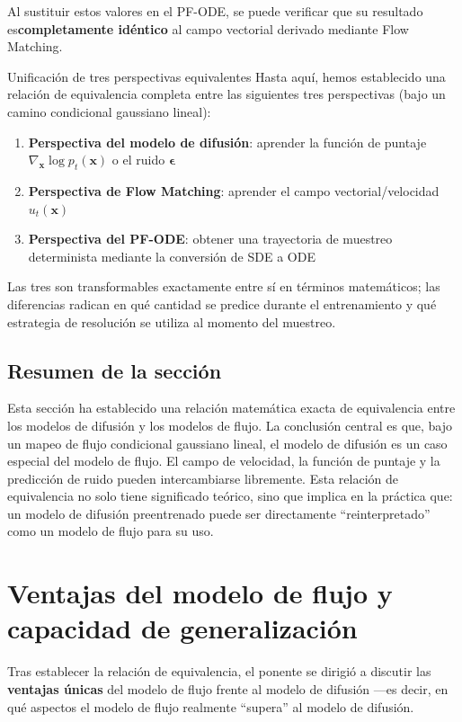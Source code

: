 \documentclass[a4paper]{article}
\begin{document}
Al sustituir estos valores en el PF-ODE, se puede verificar que su resultado es\textbf{completamente idéntico} al campo vectorial derivado mediante Flow Matching.

\begin{importantbox}{Unificación de tres perspectivas equivalentes}
Hasta aquí, hemos establecido una relación de equivalencia completa entre las siguientes tres perspectivas (bajo un camino condicional gaussiano lineal):
\begin{enumerate}
    \item \textbf{Perspectiva del modelo de difusión}: aprender la función de puntaje $\nabla_\mathbf{x} \log p_t(\mathbf{x})$ o el ruido $\boldsymbol{\epsilon}$
    \item \textbf{Perspectiva de Flow Matching}: aprender el campo vectorial/velocidad $u_t(\mathbf{x})$
    \item \textbf{Perspectiva del PF-ODE}: obtener una trayectoria de muestreo determinista mediante la conversión de SDE a ODE
\end{enumerate}
Las tres son transformables exactamente entre sí en términos matemáticos; las diferencias radican en qué cantidad se predice durante el entrenamiento y qué estrategia de resolución se utiliza al momento del muestreo.
\end{importantbox}

\subsection{Resumen de la sección}

Esta sección ha establecido una relación matemática exacta de equivalencia entre los modelos de difusión y los modelos de flujo. La conclusión central es que, bajo un mapeo de flujo condicional gaussiano lineal, el modelo de difusión es un caso especial del modelo de flujo. El campo de velocidad, la función de puntaje y la predicción de ruido pueden intercambiarse libremente. Esta relación de equivalencia no solo tiene significado teórico, sino que implica en la práctica que: un modelo de difusión preentrenado puede ser directamente ``reinterpretado'' como un modelo de flujo para su uso.

\section{Ventajas del modelo de flujo y capacidad de generalización}

Tras establecer la relación de equivalencia, el ponente se dirigió a discutir las \textbf{ventajas únicas} del modelo de flujo frente al modelo de difusión —es decir, en qué aspectos el modelo de flujo realmente ``supera'' al modelo de difusión.
\end{document}
